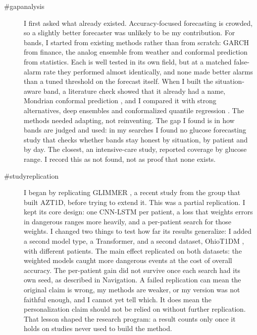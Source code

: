 \begin{description}
\item[\#gapanalysis] I first asked what already existed. Accuracy-focused forecasting is crowded, so a slightly better forecaster was unlikely to be my contribution. For bands, I started from existing methods rather than from scratch: GARCH from finance, the analog ensemble from weather and conformal prediction from statistics. Each is well tested in its own field, but at a matched false-alarm rate they performed almost identically, and none made better alarms than a tuned threshold on the forecast itself. When I built the situation-aware band, a literature check showed that it already had a name, Mondrian conformal prediction \parencite{vovk2005alrw}, and I compared it with strong alternatives, deep ensembles \parencite{lakshminarayanan2017ensembles} and conformalized quantile regression \parencite{romano2019cqr}. The methods needed adapting, not reinventing. The gap I found is in how bands are judged and used: in my searches I found no glucose forecasting study that checks whether bands stay honest by situation, by patient and by day. The closest, an intensive-care study, reported coverage by glucose range. I record this as not found, not as proof that none exists.
\item[\#studyreplication] I began by replicating GLIMMER \parencite{glimmer2026}, a recent study from the group that built AZT1D, before trying to extend it. This was a partial replication. I kept its core design: one CNN-LSTM per patient, a loss that weights errors in dangerous ranges more heavily, and a per-patient search for those weights. I changed two things to test how far its results generalize: I added a second model type, a Transformer, and a second dataset, OhioT1DM \parencite{marling2020ohio}, with different patients. The main effect replicated on both datasets: the weighted models caught more dangerous events at the cost of overall accuracy. The per-patient gain did not survive once each search had its own seed, as described in Navigation. A failed replication can mean the original claim is wrong, my methods are weaker, or my version was not faithful enough, and I cannot yet tell which. It does mean the personalization claim should not be relied on without further replication. That lesson shaped the research program: a result counts only once it holds on studies never used to build the method.

\end{description}
